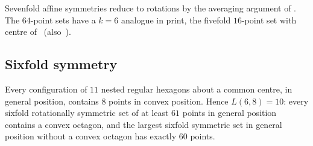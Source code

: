 Sevenfold affine symmetries reduce to rotations by the averaging argument of . The $64$-point sets have a
$k=6$ analogue in print, the fivefold $16$-point set with centre of~\cite[App.~C, Table~2]{SMQH25}
(also~\cite[Fig.~3.33]{Mac25}).

\subsection{Sixfold symmetry}

\begin{theorem}\label{k8:c6}
Every configuration of $11$ nested regular hexagons about a common centre, in general position, contains $8$ points in
convex position. Hence $L(6,8)=10$: every sixfold rotationally symmetric set of at least $61$ points in general position
contains a convex octagon, and the largest sixfold symmetric set in general position without a convex octagon has
exactly $60$ points.
\end{theorem}

